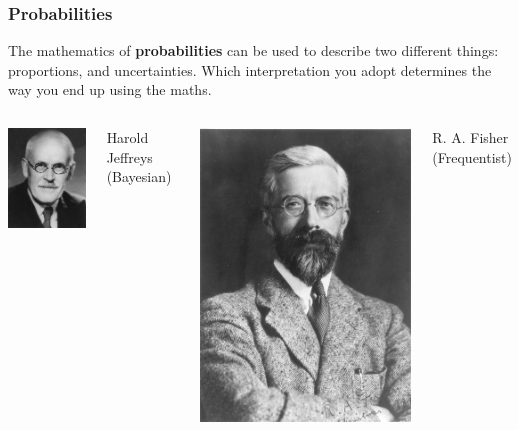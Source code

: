 \documentclass{beamer}
\begin{document}
\begin{frame}
\frametitle{Probabilities}
The mathematics of {\bf probabilities} can be used to describe two different
things: proportions, and uncertainties. Which interpretation you adopt
determines the way you end up using the maths.\pause

   \begin{columns} %

        \centering
        \includegraphics[width=0.5\linewidth]{images/jeffreys.jpg}

        Harold Jeffreys (Bayesian)

        \centering
        \includegraphics[width=0.5\linewidth]{images/fisher.jpg}

        R. A. Fisher (Frequentist)
     \end{columns}


\end{frame}
\end{document}
